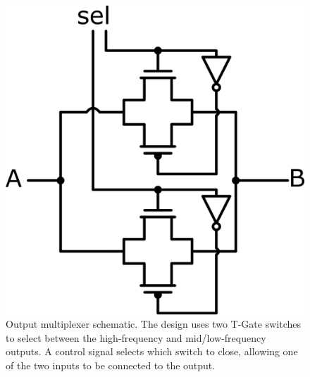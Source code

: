 \begin{figure}[htbp]
  \centering
  \includegraphics[width=0.3\linewidth]{figures/Schematics/output_mux.png}
  \caption{Output multiplexer schematic. The design uses two T-Gate switches to select between the high-frequency and mid/low-frequency outputs. A control signal selects which switch to close, allowing one of the two inputs to be connected to the output.}
  \label{fig:output_mux}
\end{figure}

